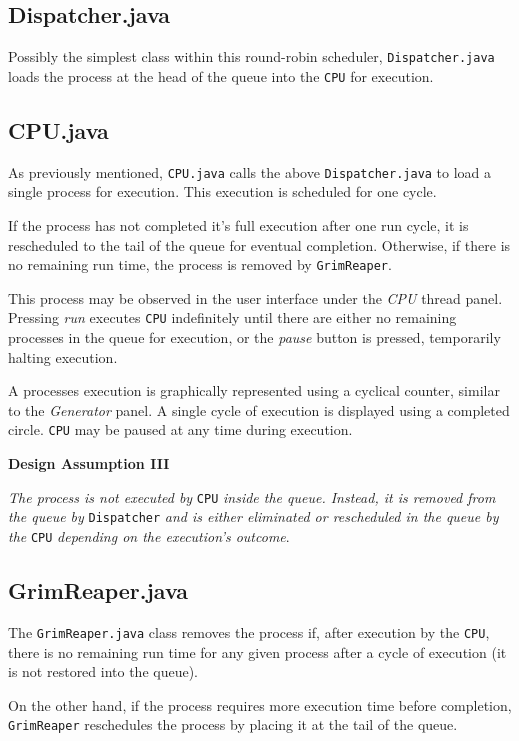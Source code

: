 \documentclass[]{report}
\begin{document}
\vspace{2mm}

\subsection*{Dispatcher.java}
Possibly the simplest class within this round-robin scheduler, \verb|Dispatcher.java| loads the process at the head of the queue into the \verb|CPU| for execution.

\vspace{2mm}

\subsection*{CPU.java}
As previously mentioned, \verb|CPU.java| calls the above \verb|Dispatcher.java| to load a single process for execution. This execution is scheduled for one cycle. \par 
If the process has not completed it's full execution after one run cycle, it is rescheduled to the tail of the queue for eventual completion. Otherwise, if there is no remaining run time, the process is removed by \verb|GrimReaper|. \par 
This process may be observed in the user interface under the \textit{CPU} thread panel. Pressing \textit{run} executes \verb|CPU| indefinitely until there are either no remaining processes in the queue for execution, or the \textit{pause} button is pressed, temporarily halting execution. \par 
A processes execution is graphically represented using a cyclical counter, similar to the \textit{Generator} panel. A single cycle of execution is displayed using a completed circle. \verb|CPU| may be paused at any time during execution.

\newpage 

\begin{mdframed}[backgroundcolor=lightgray!40]
	\textbf{Design Assumption III} \par 
	\textit{The process is not executed by} \verb|CPU| \textit{inside the queue. Instead, it is removed from the queue by} \verb|Dispatcher| \textit{and is either eliminated or rescheduled in the queue by the} \verb|CPU| \textit{depending on the execution's outcome}.
\end{mdframed}

\vspace{2mm}

\subsection*{GrimReaper.java}
The \verb|GrimReaper.java| class removes the process if, after execution by the \verb|CPU|, there is no remaining run time for any given process after a cycle of execution (it is not restored into the queue). \par 
On the other hand, if the process requires more execution time before completion, \verb|GrimReaper| reschedules the process by placing it at the tail of the queue.
\end{document}
